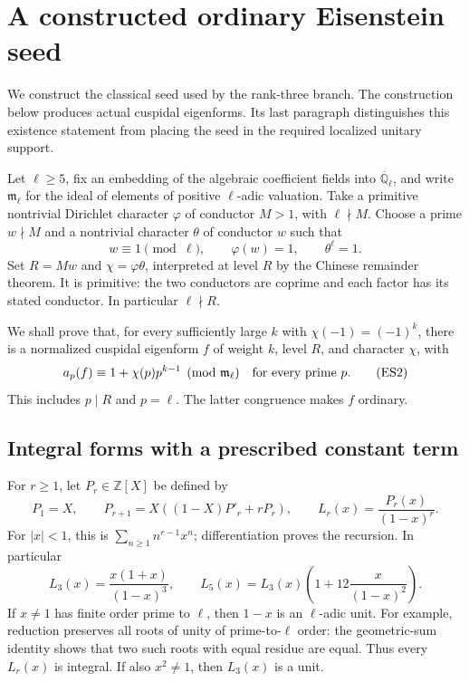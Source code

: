 \section{A constructed ordinary Eisenstein seed}
\label{sec:constructed-eisenstein-seed}

We construct the classical seed used by the rank-three branch.
The construction below produces actual cuspidal eigenforms.
Its last paragraph distinguishes this existence statement from
placing the seed in the required localized unitary support.

Let \(\ell\ge5\), fix an embedding of the algebraic coefficient
fields into \(\overline{\mathbb Q}_\ell\), and write
\(\mathfrak m_\ell\) for the ideal of elements of positive
\(\ell\)-adic valuation.
Take a primitive nontrivial Dirichlet character \(\varphi\)
of conductor \(M>1\), with \(\ell\nmid M\).
Choose a prime \(w\nmid M\) and a nontrivial character
\(\theta\) of conductor \(w\) such that
\[
       w\equiv1\pmod\ell,\qquad
       \varphi(w)=1,\qquad \theta^\ell=1 .
 \tag{ES1}
\]
Set \(R=Mw\) and \(\chi=\varphi\theta\), interpreted at level
\(R\) by the Chinese remainder theorem.
It is primitive: the two conductors are coprime and each
factor has its stated conductor.
In particular \(\ell\nmid R\).

We shall prove that, for every sufficiently large \(k\) with
\(\chi(-1)=(-1)^k\), there is a normalized cuspidal eigenform
\(f\) of weight \(k\), level \(R\), and character \(\chi\), with
\[
          a_p(f)\equiv1+\chi(p)p^{k-1}\pmod{\mathfrak m_\ell}
                       \quad\hbox{for every prime }p .
 \tag{ES2}
\]
This includes \(p\mid R\) and \(p=\ell\).
The latter congruence makes \(f\) ordinary.

\subsection{Integral forms with a prescribed constant term}
For \(r\ge1\), let \(P_r\in\mathbb Z[X]\) be defined by
\[
 P_1=X,\qquad
 P_{r+1}=X((1-X)P'_r+rP_r),\qquad
                    L_r(x)=\frac{P_r(x)}{(1-x)^r}.
\]
For \(|x|<1\), this is
\(\sum_{n\ge1}n^{r-1}x^n\); differentiation proves the recursion.
In particular
\[
 L_3(x)=\frac{x(1+x)}{(1-x)^3},\qquad
 L_5(x)=L_3(x)\left(1+12\frac{x}{(1-x)^2}\right).
 \tag{ES3}
\]
If \(x\ne1\) has finite order prime to \(\ell\), then
\(1-x\) is an \(\ell\)-adic unit.
For example, reduction preserves all roots of unity of
prime-to-\(\ell\) order: the geometric-sum identity shows
that two such roots with equal residue are equal.
Thus every \(L_r(x)\) is integral.
If also \(x^2\ne1\), then \(L_3(x)\) is a unit.

